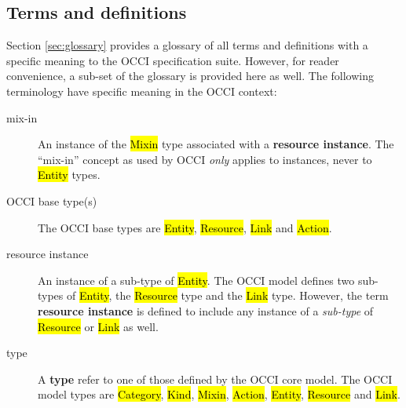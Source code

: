 \documentclass[10pt,a4paper]{article}
\begin{document}
\subsection{Terms and definitions}
Section \ref{sec:glossary} provides a glossary of all terms and definitions with
a specific meaning to the OCCI specification suite. However, for reader
convenience, a sub-set of the glossary is provided here as well. The following
terminology have specific meaning in the OCCI context:
\begin{description}
\item[mix-in] An instance of the \hl{Mixin} type associated with a {\bf resource
 instance}. The ``mix-in'' concept as used by OCCI {\em only} applies to
 instances, never to \hl{Entity} types.
\item[OCCI base type(s)] The OCCI base types are \hl{Entity}, \hl{Resource},
 \hl{Link} and \hl{Action}.
\item[resource instance] An instance of a sub-type of \hl{Entity}. The OCCI
 model defines two sub-types of \hl{Entity}, the \hl{Resource} type and the
 \hl{Link} type.  However, the term {\bf resource instance} is defined to
 include any instance of a {\em sub-type} of \hl{Resource} or \hl{Link} as
 well.
\item[type] A {\bf type} refer to one of those defined by the OCCI core model.
The OCCI model types are \hl{Category}, \hl{Kind}, \hl{Mixin}, \hl{Action},
\hl{Entity}, \hl{Resource} and \hl{Link}.
\end{description}
\end{document}
